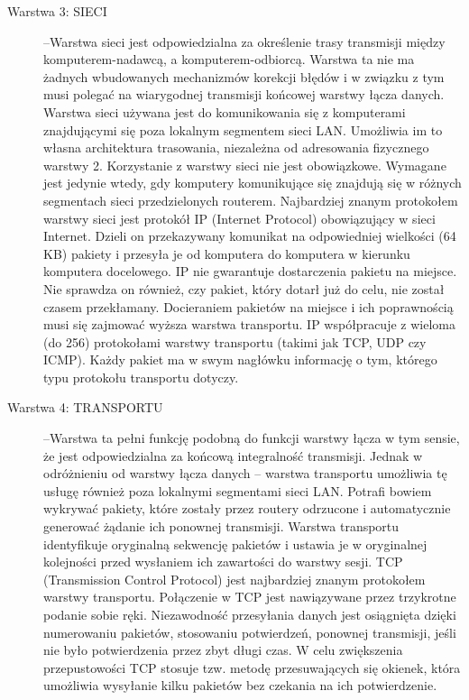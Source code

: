 \documentclass[a4paper,11pt]{article}
\begin{document}
\begin {description}
\item[Warstwa 3: SIECI]--Warstwa sieci jest odpowiedzialna za określenie trasy transmisji między komputerem-nadawcą, a komputerem-odbiorcą. Warstwa ta nie ma żadnych wbudowanych mechanizmów korekcji błędów i w związku z tym musi polegać na wiarygodnej transmisji końcowej warstwy łącza danych. Warstwa sieci używana jest do komunikowania się z komputerami znajdującymi się poza lokalnym segmentem sieci LAN. Umożliwia im to własna architektura trasowania, niezależna od adresowania fizycznego warstwy 2. Korzystanie z warstwy sieci nie jest obowiązkowe. Wymagane jest jedynie wtedy, gdy komputery komunikujące się znajdują się w różnych segmentach sieci przedzielonych routerem. Najbardziej znanym protokołem warstwy sieci jest protokół IP (Internet Protocol) obowiązujący w sieci Internet. Dzieli on przekazywany komunikat na odpowiedniej wielkości (64 KB) pakiety i przesyła je od komputera do komputera w kierunku komputera docelowego. IP nie gwarantuje dostarczenia pakietu na miejsce. Nie sprawdza on również, czy pakiet, który dotarł już do celu, nie został czasem przekłamany. Docieraniem pakietów na miejsce i ich poprawnością musi się zajmować wyższa warstwa transportu. IP współpracuje z wieloma (do 256) protokołami warstwy transportu (takimi jak TCP, UDP czy ICMP). Każdy pakiet ma w swym nagłówku informację o tym, którego typu protokołu transportu dotyczy. 

\item[Warstwa 4: TRANSPORTU]--Warstwa ta pełni funkcję podobną do funkcji warstwy łącza w tym sensie, że jest odpowiedzialna za końcową integralność transmisji. Jednak w odróżnieniu od warstwy łącza danych -- warstwa transportu umożliwia tę usługę również poza lokalnymi segmentami sieci LAN. Potrafi bowiem wykrywać pakiety, które zostały przez routery odrzucone i automatycznie generować żądanie ich ponownej transmisji. Warstwa transportu identyfikuje oryginalną sekwencję pakietów i ustawia je w oryginalnej kolejności przed wysłaniem ich zawartości do warstwy sesji. TCP (Transmission Control Protocol) jest najbardziej znanym protokołem warstwy transportu. Połączenie w TCP jest nawiązywane przez trzykrotne podanie sobie ręki. Niezawodność przesyłania danych jest osiągnięta dzięki numerowaniu pakietów, stosowaniu potwierdzeń, ponownej transmisji, jeśli nie było potwierdzenia przez zbyt długi czas. W celu zwiększenia przepustowości TCP stosuje tzw. metodę przesuwających się okienek, która umożliwia wysyłanie kilku pakietów bez czekania na ich potwierdzenie. 


\end{description}
\end{document}
